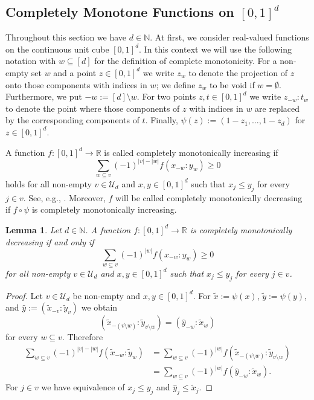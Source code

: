 \documentclass{article}
\newcommand{\R}  {{\mathbb R}}
\newcommand{\N}  {{\mathbb N}}
\newcommand{\U}  {\mathcal{U}}
\theoremstyle{plain}
\newtheorem{lemma}{Lemma}
\theoremstyle{definition}
\begin{document}
\subsection{Completely Monotone Functions on $[0,1]^d$}\label{a2}

Throughout this section we have $d \in \N$.
At first, we consider real-valued
functions on the continuous unit cube 
$[0,1]^d$. In this context we will use the following 
notation with $w \subseteq [d]$ for the definition of complete
monotonicity.
For a non-empty set $w$ and a point $z\in [0,1]^d$ 
we write $z_w$ to denote the projection 
of $z$ onto those components with indices in $w$; 
we define $z_w$ to be void if $w=\emptyset$. 
Furthermore, we put $-w := [d] \setminus w$.
For two points $z,t\in [0,1]^d$ we write $z_{-w}\!:\!t_w$
to denote the point where 
those components of $z$ with indices in $w$ are replaced by the 
corresponding components of $t$.
Finally, $\psi(z) := (1-z_1,\dots,1-z_d)$ for $z \in [0,1]^d$.

A function $f \colon [0,1]^d \to \R$
is called completely monotonically increasing
if  
\[
\sum_{w \subseteq v} (-1)^{|v|-|w|} f(x_{-w}\!:\!y_w)\ge 0
\]
holds for all non-empty $v\in \U_d$ and 
$x, y\in [0,1]^d$ such that $x_j \leq y_j$ for every $j \in v$.
See, e.g., \citet[Sec.~2.3]{GKOP24}. Moreover,
$f$ will be called completely monotonically decreasing if 
$f \circ \psi$ is completely monotonically increasing.


\begin{lemma}\label{Lemma32}
Let $d\in\N$. A function $f \colon [0,1]^d \to \R$ is 
completely monotonically decreasing if and only if 
\[
\sum_{w \subseteq v} (-1)^{|w|} f(x_{-w}\!:\!y_w)\ge 0
\]
for all non-empty $v\in \U_d$ and 
$x, y\in [0,1]^d$ such that $x_j \leq y_j$ for every $j \in v$.
\end{lemma}


\begin{proof} 
Let $v\in \U_d$ be non-empty and $x, y\in [0,1]^d$.
For $\widetilde{x} := \psi(x)$, $\widetilde{y} := \psi(y)$,
and $\widehat{y} := (\widetilde{x}_{-v}\!:\!\widetilde{y}_v)$
we obtain
\[
(\widetilde{x}_{-(v \setminus w)}\!:\!\widetilde{y}_{v \setminus w})
= 
(\widehat{y}_{-w}\!:\!\widetilde{x}_w)
\]
for every $w \subseteq v$. Therefore
\begin{align*}
\sum_{w \subseteq v} (-1)^{|v|-|w|}
f(\widetilde{x}_{-w}\!:\!\widetilde{y}_w)
&= \sum_{w \subseteq v} (-1)^{|w|}
f(\widetilde{x}_{-(v \setminus w)}\!:\!\widetilde{y}_{v \setminus w}) \\
&= \sum_{w \subseteq v} (-1)^{|w|}
f(\widehat{y}_{-w}\!:\!\widetilde{x}_w).
\end{align*}
For $j \in v$ we have equivalence of
$x_j \leq y_j$ and $\widehat{y}_j \leq \widetilde{x}_j$.
\end{proof}
\end{document}
